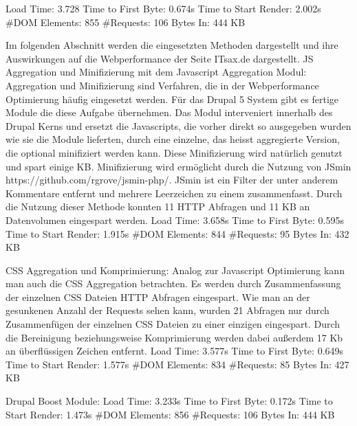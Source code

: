 Load Time: 3.728
Time to First Byte: 0.674s 	
Time to Start Render: 2.002s
\#DOM Elements: 855 	
\#Requests: 106
Bytes In: 444 KB


Im folgenden Abschnitt werden die eingesetzten Methoden dargestellt und ihre Auswirkungen auf die Webperformance der Seite ITsax.de dargestellt. 
JS Aggregation und Minifizierung mit dem Javascript Aggregation Modul:
Aggregation und Minifizierung sind Verfahren, die in der Webperformance Optimierung häufig eingesetzt werden. Für das Drupal 5 System gibt es fertige Module die diese Aufgabe übernehmen. Das Modul interveniert innerhalb des Drupal Kerns und ersetzt die Javascripts, die vorher direkt so ausgegeben wurden wie sie die Module lieferten, durch eine einzelne, das heisst aggregierte Version, die optional minifiziert werden kann. Diese Minifizierung wird natürlich genutzt und spart einige KB. Minifizierung wird ermöglicht durch die Nutzung von JSmin https://github.com/rgrove/jsmin-php/. JSmin ist ein Filter der unter anderem Kommentare entfernt und mehrere Leerzeichen zu einem zusammenfasst. Durch die Nutzung dieser Methode konnten 11 HTTP Abfragen und 11 KB an Datenvolumen eingespart werden.
Load Time: 3.658s
Time to First Byte: 0.595s
Time to Start Render: 1.915s
\#DOM Elements: 844 	
\#Requests: 95 %
Bytes In: 432 KB

CSS Aggregation und Komprimierung:
Analog zur Javascript Optimierung kann man auch die CSS Aggregation betrachten. Es werden durch Zusammenfassung der einzelnen CSS Dateien HTTP Abfragen eingespart. Wie man an der gesunkenen Anzahl der Requests sehen kann, wurden 21 Abfragen nur durch Zusammenfügen der einzelnen CSS Dateien zu einer einzigen eingespart. Durch die Bereinigung beziehungsweise Komprimierung werden dabei außerdem 17 Kb an überflüssigen Zeichen entfernt. 
Load Time: 3.577s
Time to First Byte: 0.649s
Time to Start Render: 1.577s
\#DOM Elements: 834 	
\#Requests: 85 %
Bytes In: 427 KB

Drupal Boost Module:
Load Time: 3.233s
Time to First Byte: 0.172s %
Time to Start Render: 1.473s
\#DOM Elements: 856 	
\#Requests: 106 %
Bytes In: 444 KB

